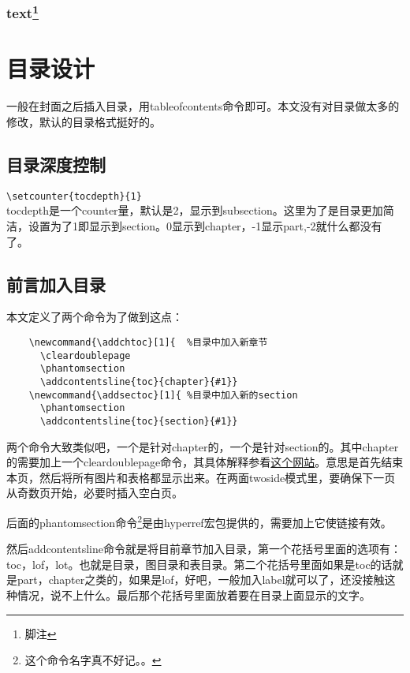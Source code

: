 \documentclass[11pt,oneside]{book}
\begin{document}
  \subsection[text]{{\color{red}    text}\footnote{脚注}}



  \chapter{目录设计}
  一般在封面之后插入目录，用tableofcontents命令即可。本文没有对目录做太多的修改，默认的目录格式挺好的。

  \section{目录深度控制}
  \verb+\setcounter{tocdepth}{1} +\\
  tocdepth是一个counter量，默认是2，显示到subsection。这里为了是目录更加简洁，设置为了1即显示到section。0显示到chapter，-1显示part,-2就什么都没有了。

  \section{前言加入目录}
  \label{sec:前言加入目录}
  本文定义了两个命令为了做到这点：
  \begin{Verbatim}
    \newcommand{\addchtoc}[1]{  %目录中加入新章节
      \cleardoublepage
      \phantomsection
      \addcontentsline{toc}{chapter}{#1}}
    \newcommand{\addsectoc}[1]{ %目录中加入新的section
      \phantomsection
      \addcontentsline{toc}{section}{#1}}
  \end{Verbatim}
  两个命令大致类似吧，一个是针对chapter的，一个是针对section的。其中chapter的需要加上一个cleardoublepage命令，其具体解释参看\href{http://www.personal.ceu.hu/tex/breaking.htm#clrdblpage}{这个网站}。意思是首先结束本页，然后将所有图片和表格都显示出来。在两面twoside模式里，要确保下一页从奇数页开始，必要时插入空白页。

  后面的phantomsection命令\footnote{这个命令名字真不好记。。}是由hyperref宏包提供的，需要加上它使链接有效。

  然后addcontentsline命令就是将目前章节加入目录，第一个花括号里面的选项有：toc，lof，lot。也就是目录，图目录和表目录。第二个花括号里面如果是toc的话就是part，chapter之类的，如果是lof，好吧，一般加入label就可以了，还没接触这种情况，说不上什么。最后那个花括号里面放着要在目录上面显示的文字。
\end{document}
